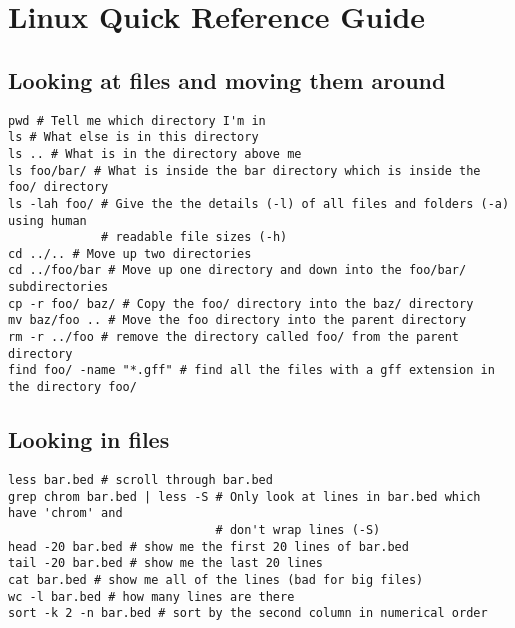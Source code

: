 \documentclass[11pt]{article}
\begin{document}



\newpage





    \hypertarget{linux-quick-reference-guide}{%
\section{Linux Quick Reference
Guide}\label{linux-quick-reference-guide}}

\hypertarget{looking-at-files-and-moving-them-around}{%
\subsection{Looking at files and moving them
around}\label{looking-at-files-and-moving-them-around}}

\begin{verbatim}
pwd # Tell me which directory I'm in
ls # What else is in this directory
ls .. # What is in the directory above me
ls foo/bar/ # What is inside the bar directory which is inside the foo/ directory
ls -lah foo/ # Give the the details (-l) of all files and folders (-a) using human
             # readable file sizes (-h)
cd ../.. # Move up two directories
cd ../foo/bar # Move up one directory and down into the foo/bar/ subdirectories
cp -r foo/ baz/ # Copy the foo/ directory into the baz/ directory
mv baz/foo .. # Move the foo directory into the parent directory
rm -r ../foo # remove the directory called foo/ from the parent directory
find foo/ -name "*.gff" # find all the files with a gff extension in the directory foo/
\end{verbatim}

\hypertarget{looking-in-files}{%
\subsection{Looking in files}\label{looking-in-files}}

\begin{verbatim}
less bar.bed # scroll through bar.bed
grep chrom bar.bed | less -S # Only look at lines in bar.bed which have 'chrom' and
                             # don't wrap lines (-S)
head -20 bar.bed # show me the first 20 lines of bar.bed
tail -20 bar.bed # show me the last 20 lines
cat bar.bed # show me all of the lines (bad for big files)
wc -l bar.bed # how many lines are there
sort -k 2 -n bar.bed # sort by the second column in numerical order
\end{verbatim}
\end{document}
